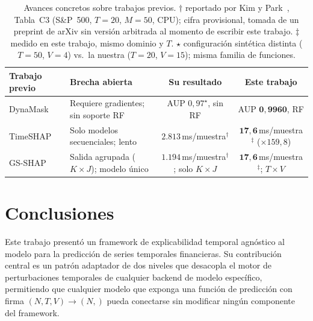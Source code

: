 \documentclass[conference, letterpaper]{IEEEtran}
\newcommand{\cmark}{\checkmark}
\begin{document}
\begin{table}[ht]
\centering
\caption{Avances concretos sobre trabajos previos.
  $\dagger$ reportado por Kim y Park~\cite{gsshap2026}, Tabla~C3
  (S\&P~500, $T{=}20$, $M{=}50$, CPU); cifra provisional, tomada de
  un preprint de arXiv sin versión arbitrada al momento de escribir
  este trabajo.
  $\ddagger$ medido en este trabajo, mismo dominio y $T$.
  $\star$ configuración sintética distinta ($T{=}50$, $V{=}4$) vs.\
  la nuestra ($T{=}20$, $V{=}15$); misma familia de funciones.}
\label{tab:advances}
\scriptsize
\setlength{\tabcolsep}{4pt}
\begin{tabular}{lp{2.8cm}cc}
\toprule
\textbf{Trabajo previo} & \textbf{Brecha abierta} &
\textbf{Su resultado} & \textbf{Este trabajo} \\
\midrule
DynaMask~\cite{crabbe2021}
  & Requiere gradientes; sin soporte RF
  & AUP $0{,}97^{\star}$, sin RF
  & AUP $\mathbf{0{,}9960}$, RF \cmark \\[2pt]
TimeSHAP~\cite{bento2021}
  & Solo modelos secuenciales; lento
  & $2{.}813$\,ms/muestra$^{\dagger}$
  & $\mathbf{17{,}6}$\,ms/muestra$^{\ddagger}$ (${\times}159{,}8$) \\[2pt]
GS-SHAP~\cite{gsshap2026}
  & Salida agrupada ($K{\times}J$); modelo único
  & $1{.}194$\,ms/muestra$^{\dagger}$; solo $K{\times}J$
  & $\mathbf{17{,}6}$\,ms/muestra$^{\ddagger}$; $T{\times}V$ \cmark \\
\bottomrule
\end{tabular}
\end{table}


\section{Conclusiones}
\label{sec:conclusiones}

Este trabajo presentó un framework de explicabilidad temporal
agnóstico al modelo para la predicción de series temporales
financieras. Su contribución central es un patrón adaptador de dos
niveles que desacopla el motor de perturbaciones temporales de
cualquier backend de modelo específico, permitiendo que cualquier
modelo que exponga una función de predicción con firma
$(N, T, V) \rightarrow (N,)$ pueda conectarse sin modificar ningún
componente del framework.
\end{document}
